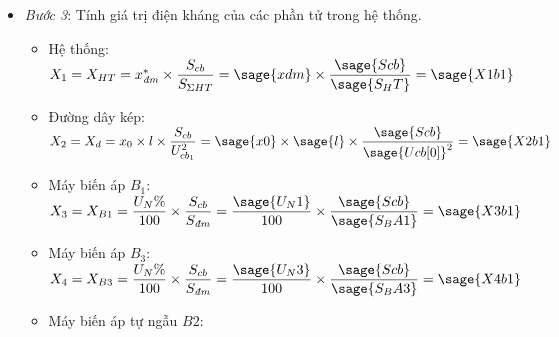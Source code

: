 \documentclass[12pt,a4paper]{article}
\newcommand{\viss}[1]{#1_\text{\textit{đm}}} %
\newcommand{\pfm}[1]{\left({#1}\right)} %
\begin{document}
\begin{itemize}
	\newpage
	\item \textit{Bước 3}: Tính giá trị điện kháng của các phần tử trong hệ thống.
		\begin{itemize}
		
			\item Hệ thống: $X_1 = X_{HT} = \viss{x}^\ast \times \dfrac{S_{cb}}{S_{\Sigma HT}}=\sage{xdm}\times \dfrac{\sage{Scb}}{\sage{S_HT}} = \sage{X1b1}$
			
			\item Đường dây kép: $X_2 = X_d = x_0 \times l \times \dfrac{S_{cb}}{U_{cb_{1}}^2} = \sage{x0} \times \sage{l} \times \dfrac{\sage{Scb}}{\sage{Ucb[0]}^2} = \sage{X2b1}$
			
			\item Máy biến áp $B_1$: $X_3 = X_{B1} = \dfrac{U_N\%}{100} \times \dfrac{S_{cb}}{\viss{S}} = \dfrac{\sage{U_N1}}{100}\times \dfrac{\sage{Scb}}{\sage{S_BA1}}=\sage{X3b1}$
			
			\item Máy biến áp $B_3$: $X_4 = X_{B3} = \dfrac{U_N\%}{100} \times \dfrac{S_{cb}}{\viss{S}} = \dfrac{\sage{U_N3}}{100}\times \dfrac{\sage{Scb}}{\sage{S_BA3}}=\sage{X4b1}$

			\item Máy biến áp tự ngẫu $B2$:
\end{itemize}
\end{itemize}
\end{document}
